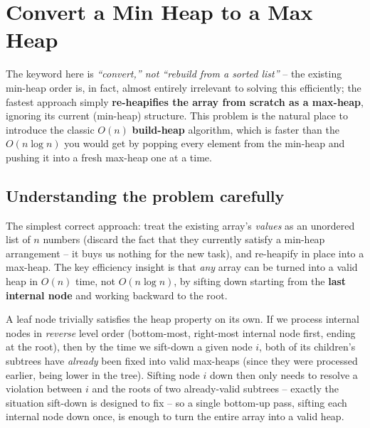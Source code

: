 \section{Convert a Min Heap to a Max Heap}
\label{sec:heap-min-to-max}


\begin{patternbox}
The keyword here is \emph{``convert,'' not ``rebuild from a sorted
list''} -- the existing min-heap order is, in fact, almost entirely
irrelevant to solving this efficiently; the fastest approach simply
\textbf{re-heapifies the array from scratch as a max-heap}, ignoring its
current (min-heap) structure. This problem is the natural place to
introduce the classic $O(n)$ \textbf{build-heap} algorithm, which is
faster than the $O(n \log n)$ you would get by popping every element from
the min-heap and pushing it into a fresh max-heap one at a time.
\end{patternbox}

\subsection*{Understanding the problem carefully}

The simplest correct approach: treat the existing array's \emph{values}
as an unordered list of $n$ numbers (discard the fact that they currently
satisfy a min-heap arrangement -- it buys us nothing for the new task),
and re-heapify in place into a max-heap. The key efficiency insight is
that \emph{any} array can be turned into a valid heap in $O(n)$ time, not
$O(n \log n)$, by sifting down starting from the \textbf{last internal
node} and working backward to the root.

\begin{ideabox}
A leaf node trivially satisfies the heap property on its own. If we
process internal nodes in \emph{reverse} level order (bottom-most,
right-most internal node first, ending at the root), then by the time we
sift-down a given node $i$, both of its children's subtrees have
\emph{already} been fixed into valid max-heaps (since they were processed
earlier, being lower in the tree). Sifting node $i$ down then only needs
to resolve a violation between $i$ and the roots of two already-valid
subtrees -- exactly the situation sift-down is designed to fix -- so a
single bottom-up pass, sifting each internal node down once, is enough to
turn the entire array into a valid heap.
\end{ideabox}

